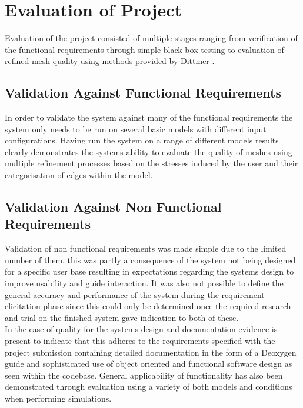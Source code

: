 
\section{Evaluation of Project}
Evaluation of the project consisted of multiple stages ranging from verification of the functional requirements through simple black box testing to evaluation of refined mesh quality using methods provided by Dittmer \cite{DittmerMeshQualityMet}. 

\subsection{Validation Against Functional Requirements}
In order to validate the system against many of the functional requirements the system only needs to be run on several basic models with different input configurations. Having run the system on a range of different models results clearly demonstrates the systems ability to evaluate the quality of meshes using multiple refinement processes based on the stresses induced by the user and their categorisation of edges within the model. 

\subsection{Validation Against Non Functional Requirements}
Validation of non functional requirements was made simple due to the limited number of them, this was partly a consequence of the system not being designed for a specific user base resulting in expectations regarding the systems design to improve usability and guide interaction. It was also not possible to define the general accuracy and performance of the system during the requirement elicitation phase since this could only be determined once the required research and trial on the finished system gave indication to both of these. \\

\noindent
In the case of quality for the systems design and documentation evidence is present to indicate that this adheres to the requirements specified with the project submission containing detailed documentation in the form of a Deoxygen guide and sophisticated use of object oriented and functional software design as seen within the codebase. General applicability of functionality has also been demonstrated through evaluation using a variety of both models and conditions when performing simulations.

